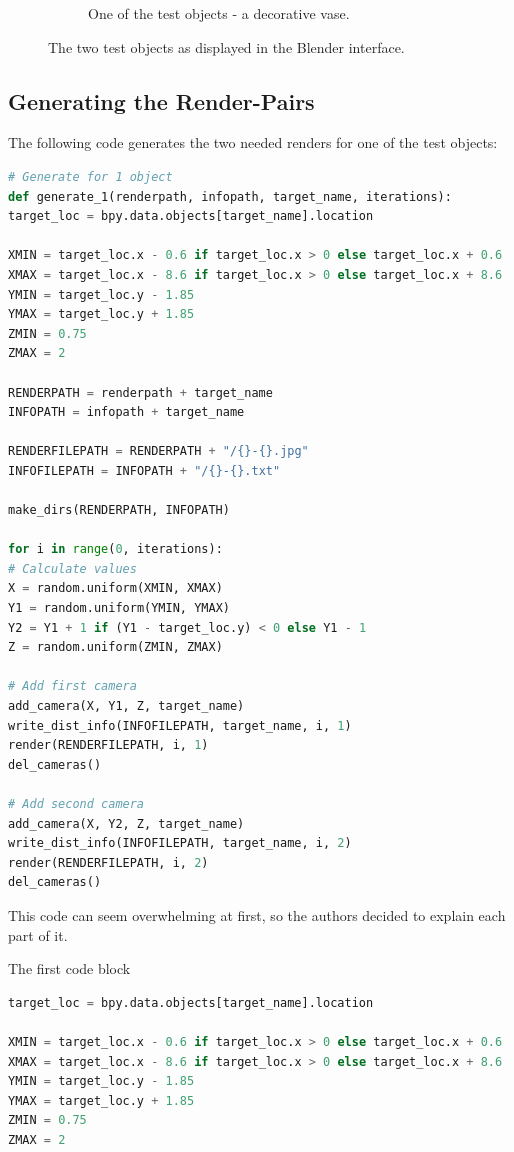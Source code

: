 \begin{figure}[h!]
\begin{subfigure}[t]{0.4\textwidth}
		\caption{One of the test objects - a decorative vase.}
	\end{subfigure}
	\caption{The two test objects as displayed in the Blender interface.}
	\label{pic:implementation_generatingData_testObject}
\end{figure}

\newpage

\subsection{Generating the Render-Pairs}
The following code generates the two needed renders for one of the test objects:

\newpage

\begin{lstlisting}[language=python]
# Generate for 1 object
def generate_1(renderpath, infopath, target_name, iterations):
target_loc = bpy.data.objects[target_name].location

XMIN = target_loc.x - 0.6 if target_loc.x > 0 else target_loc.x + 0.6
XMAX = target_loc.x - 8.6 if target_loc.x > 0 else target_loc.x + 8.6
YMIN = target_loc.y - 1.85
YMAX = target_loc.y + 1.85
ZMIN = 0.75
ZMAX = 2

RENDERPATH = renderpath + target_name
INFOPATH = infopath + target_name

RENDERFILEPATH = RENDERPATH + "/{}-{}.jpg"
INFOFILEPATH = INFOPATH + "/{}-{}.txt"

make_dirs(RENDERPATH, INFOPATH)

for i in range(0, iterations):
# Calculate values
X = random.uniform(XMIN, XMAX)
Y1 = random.uniform(YMIN, YMAX)
Y2 = Y1 + 1 if (Y1 - target_loc.y) < 0 else Y1 - 1
Z = random.uniform(ZMIN, ZMAX)

# Add first camera
add_camera(X, Y1, Z, target_name)
write_dist_info(INFOFILEPATH, target_name, i, 1)
render(RENDERFILEPATH, i, 1)
del_cameras()

# Add second camera
add_camera(X, Y2, Z, target_name)
write_dist_info(INFOFILEPATH, target_name, i, 2)
render(RENDERFILEPATH, i, 2)
del_cameras()
\end{lstlisting}

This code can seem overwhelming at first, so the authors decided to explain each part of it.

\newpage

The first code block

\begin{lstlisting}[language=python]
target_loc = bpy.data.objects[target_name].location

XMIN = target_loc.x - 0.6 if target_loc.x > 0 else target_loc.x + 0.6
XMAX = target_loc.x - 8.6 if target_loc.x > 0 else target_loc.x + 8.6
YMIN = target_loc.y - 1.85
YMAX = target_loc.y + 1.85
ZMIN = 0.75
ZMAX = 2
\end{lstlisting}

